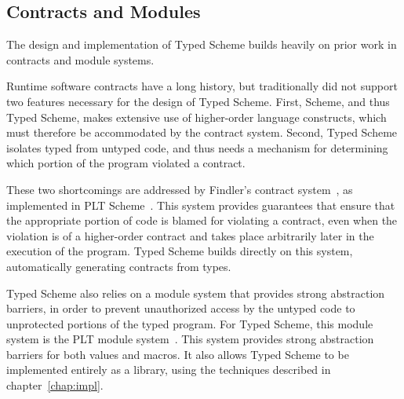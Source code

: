 \begin{schemeregion}
\section{Contracts and Modules}

The design and implementation of Typed Scheme builds heavily on prior
work in contracts and module systems.  

Runtime software contracts have a long history, but traditionally did
not support two features necessary for the design of Typed Scheme.
First, Scheme, and thus Typed Scheme, makes extensive use of
higher-order language constructs, which must therefore be accommodated
by the contract system.  Second, Typed Scheme isolates typed from
untyped code, and thus needs a mechanism for determining which portion
of the program violated a contract.  

These two shortcomings are addressed by Findler's contract
system~\cite{ff:ho-contracts}, as implemented in PLT
Scheme~\cite{plt-tr2009-reference-v4.2.2}.   This system provides
guarantees that ensure that the appropriate portion of code is blamed
for violating a contract, even when the violation is of a higher-order
contract and takes place arbitrarily later in the execution of the
program.  Typed Scheme builds directly on this system, automatically
generating contracts from types.  

Typed Scheme also relies on a module system that provides strong
abstraction barriers, in order to prevent unauthorized access by the
untyped code to unprotected portions of the typed program.  For Typed
Scheme, this module system is the PLT module
system~\cite{f:modules,plt-tr2009-reference-v4.2.2}.  This system
provides strong abstraction barriers for both values and macros.  It
also allows Typed Scheme to be implemented entirely as a library,
using the techniques described in chapter~\ref{chap:impl}.  
\end{schemeregion}

